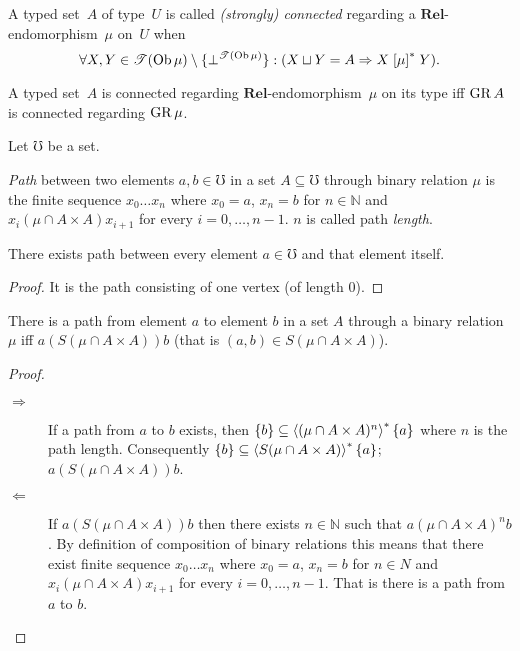 \begin{defn}
A typed set~$A$ of type~$U$ is called \emph{(strongly) connected}
regarding a $\mathbf{Rel}$-endomorphism~$\mu$ on~$U$ when
\[
\forall X,Y\in\mathscr{T}(\operatorname{Ob}\mu)\setminus\{\bot^{\mathscr{T}(\operatorname{Ob}\mu)}\}:(X\sqcup Y=A\Rightarrow X\mathrel{\left[\mu\right]^{\ast}}Y).
\]
\end{defn}
\begin{obvious}
A typed set~$A$ is connected regarding $\mathbf{Rel}$-endomorphism~$\mu$
on its type iff $\operatorname{GR} A$ is connected regarding $\operatorname{GR}\mu$.
\end{obvious}
Let $\mho$ be a set.
\begin{defn}
\emph{Path} between two elements $a,b\in\mho$ in a set
$A\subseteq\mho$ through binary relation $\mu$ is the finite sequence
$x_{0}\ldots x_{n}$ where $x_{0}=a$, $x_{n}=b$ for $n\in\mathbb{N}$
and $x_{i}\mathrel{(\mu\cap A\times A)}x_{i+1}$ for every $i=0,\ldots,n-1$.
$n$ is called path \emph{length}.\end{defn}
\begin{prop}
There exists path between every element $a\in\mho$ and that element
itself.\end{prop}
\begin{proof}
It is the path consisting of one vertex (of length $0$).\end{proof}
\begin{prop}
There is a path from element $a$ to element $b$ in a set $A$ through
a binary relation $\mu$ iff $a\mathrel{(S(\mu\cap A\times A))}b$
(that is $(a,b)\in S(\mu\cap A\times A)$).\end{prop}
\begin{proof}
~
\begin{description}
\item [{$\Rightarrow$}] If a path from $a$ to $b$ exists, then $\{b\}\subseteq\left\langle (\mu\cap A\times A)^{n}\right\rangle ^{\ast}\{a\}$
where $n$ is the path length. Consequently $\{b\}\subseteq\left\langle S(\mu\cap A\times A)\right\rangle ^{\ast}\{a\}$;
$a\mathrel{(S(\mu\cap A\times A))}b$.
\item [{$\Leftarrow$}] If $a\mathrel{(S(\mu\cap A\times A))}b$ then there
exists $n\in\mathbb{N}$ such that $a\mathrel{(\mu\cap A\times A)^{n}}b$.
By definition of composition of binary relations this means that there
exist finite sequence $x_{0}\ldots x_{n}$ where $x_{0}=a$, $x_{n}=b$
for $n\in\mathbb{}{N}$ and $x_{i}\mathrel{(\mu\cap A\times A)}x_{i+1}$
for every $i=0,\ldots,n-1$. That is there is a path from $a$ to
$b$.
\end{description}
\end{proof}
